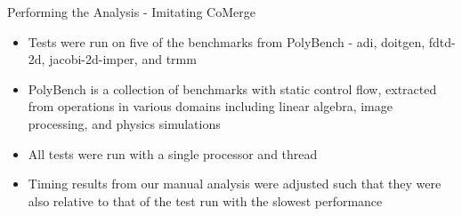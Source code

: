 \documentclass[final]{beamer}
\let\olditem\item
\renewcommand{\item}{\vspace{\fill}\olditem}
\begin{document}
\begin{frame}{\hspace{0.02\paperwidth}Performing the Analysis - Imitating CoMerge}
\begin{itemize}
\item Tests were run on five of the benchmarks from PolyBench - adi, doitgen, fdtd-2d, jacobi-2d-imper, and trmm
\item PolyBench is a collection of benchmarks with static control flow, extracted from operations in various domains including linear algebra, image processing, and physics simulations
\item All tests were run with a single processor and thread
\item Timing results from our manual analysis were adjusted such that they were also relative to that of the test run with the slowest performance
\end{itemize}
\end{frame}
\end{document}
